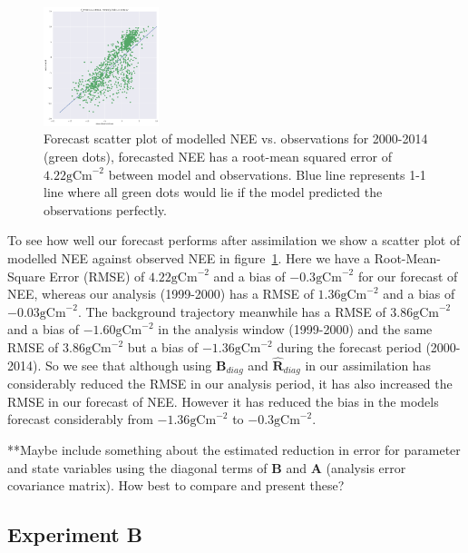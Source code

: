 \documentclass[11pt]{article}
\begin{document}
\begin{figure}[ht]
    \centering
    \includegraphics[width=0.3\textwidth]{bdiagNone_forecast_scatter.png}
    \caption{Forecast scatter plot of modelled NEE vs. observations for 2000-2014 (green dots), forecasted NEE has a root-mean squared error of $4.22 \text{gCm}^{-2}$ between model and observations. Blue line represents 1-1 line where all green dots would lie if the model predicted the observations perfectly.}
    \label{fig:forecastscatBR}
\end{figure}

To see how well our forecast performs after assimilation we show a scatter plot of modelled NEE against observed NEE in figure~\ref{fig:forecastscatBR}. Here we have a Root-Mean-Square Error (RMSE) of $4.22 \text{gCm}^{-2}$ and a bias of $-0.3 \text{gCm}^{-2}$ for our forecast of NEE, whereas our analysis (1999-2000) has a RMSE of $1.36 \text{gCm}^{-2}$ and a bias of $-0.03 \text{gCm}^{-2}$. The background trajectory meanwhile has a RMSE of $3.86 \text{gCm}^{-2}$ and a bias of $-1.60 \text{gCm}^{-2}$ in the analysis window (1999-2000) and the same RMSE of $3.86 \text{gCm}^{-2}$ but a bias of $-1.36 \text{gCm}^{-2}$ during the forecast period (2000-2014). So we see that although using $\textbf{B}_{diag}$ and $\hat{\textbf{R}}_{diag}$ in our assimilation has considerably reduced the RMSE in our analysis period, it has also increased the RMSE in our forecast of NEE. However it has reduced the bias in the models forecast considerably from $-1.36 \text{gCm}^{-2}$ to $-0.3 \text{gCm}^{-2}$.

{\color{red} **Maybe include something about the estimated reduction in error for parameter and state variables using the diagonal terms of \textbf{B} and \textbf{A} (analysis error covariance matrix). How best to compare and present these?}

\subsection{Experiment B} \label{sec:expb}
\end{document}
